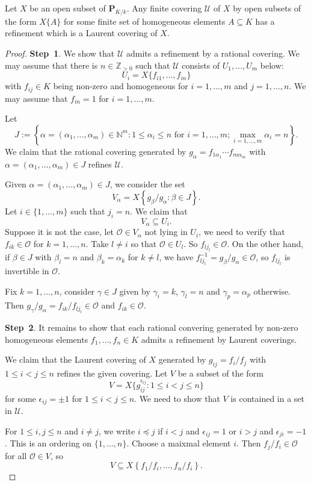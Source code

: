 \begin{lemma}\label{lma-opencovlaurentrefrz}
    Let $X$ be an open subset of $\mathbf{P}_{K/k}$.
    Any finite covering $\mathcal{U}$ of $X$ by open subsets of the form $X\{A\}$ for some finite set of homogeneous elements $A\subseteq K$ has a refinement which is a Laurent covering of $X$. 
\end{lemma}
\begin{proof}
    \textbf{Step~1}. We show that $\mathcal{U}$ admits a refinement by a rational covering. We may assume that there is $n\in \mathbb{Z}_{>0}$ such that $\mathcal{U}$ consists of $U_1,\ldots,U_m$ below:
    \[
        U_i=X\{f_{i1},\ldots,f_{in}\}
    \]
    with $f_{ij}\in K$ being non-zero and homogeneous for $i=1,\ldots,m$ and $j=1,\ldots,n$. We may assume that $f_{in}=1$ for $i=1,\ldots,m$.

    Let 
    \[
        J:=\left\{ \alpha=(\alpha_1,\ldots,\alpha_m)\in \mathbb{N}^m: 1\leq \alpha_i\leq n\text{ for }i=1,\ldots,m; \max_{i=1,\ldots,m}\alpha_i=n \right\}.  
    \] 
    We claim that the rational covering generated by $g_{\alpha}=f_{1\alpha_1}\cdots f_{m\alpha_m}$ with $\alpha=(\alpha_1,\ldots,\alpha_m)\in J$ refines $\mathcal{U}$.

    Given $\alpha=(\alpha_1,\ldots,\alpha_m)\in J$, we consider the set 
    \[
        V_{\alpha}=X\left\{g_{\beta}/g_{\alpha} :\beta\in J \right\}.  
    \]
    Let $i\in \{1,\ldots,m\}$ such that $j_i=n$. We claim that
    \[
        V_{\alpha}\subseteq U_i.
    \]
    Suppose it is not the case, let $\mathcal{O}\in V_{\alpha}$ not lying in $U_i$, we need to verify that $f_{ik}\in \mathcal{O}$ for $k=1,\ldots,n$. 
    Take $l\neq i$ so that $\mathcal{O}\in U_l$. So $f_{lj_l}\in \mathcal{O}$. On the other hand, if $\beta\in J$ with $\beta_l=n$ and $\beta_k=\alpha_k$ for $k\neq l$, we have $f_{lj_l}^{-1}=g_{\beta}/g_{\alpha}\in \mathcal{O}$, so $f_{lj_l}$ is invertible in $\mathcal{O}$. 
    
    Fix $k=1,\ldots,n$, consider $\gamma\in J$ given by $\gamma_i=k$, $\gamma_l=n$ and $\gamma_p=\alpha_p$ otherwise. Then $g_{\gamma}/g_{\alpha}=f_{ik}/f_{lj_l}\in \mathcal{O}$ and $f_{ik}\in \mathcal{O}$.

    \textbf{Step~2}. It remains to show that each rational convering generated by non-zero homogeneous elements $f_1,\ldots,f_n \in K$ admits a refinement by Laurent coverings. 

    We claim that the Laurent covering of $X$ generated by $g_{ij}=f_i/f_j$ with $1\leq i<j\leq n$ refines the given covering. Let $V$ be a subset of the form
    \[
        V=X\{g_{ij}^{\epsilon_{ij}}:1\leq i<j\leq n\}  
    \]
    for some $\epsilon_{ij}=\pm 1$ for $1\leq i<j\leq n$. We need to show that $V$ is contained in a set in $\mathcal{U}$.

    For $1\leq i,j\leq n$ and $i\neq j$, we write $i\preceq j$ if $i<j$ and $\epsilon_{ij}=1$ or $i>j$ and $\epsilon_{ji}=-1$. This is an ordering on $\{1,\ldots,n\}$. Choose a maixmal element $i$. Then $f_j/f_i\in \mathcal{O}$ for all $\mathcal{O}\in V$, so 
    \[
        V\subseteq X\left\{f_1/f_i,\ldots,f_n/f_i \right\}.  
    \]
\end{proof}


